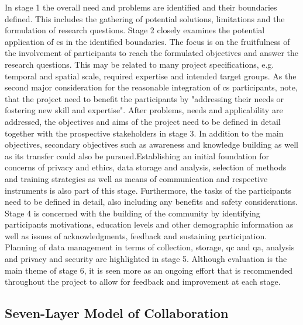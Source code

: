 In stage 1 the overall need and problems are identified and their boundaries defined. This includes the gathering of potential solutions, limitations and the formulation of research questions. Stage 2 closely examines the potential application of \acrshort{cs} in the identified boundaries. The focus is on the fruitfulness of the involvement of participants to reach the formulated objectives and answer the research questions. This may be related to many project specifications, e.g. temporal and spatial scale, required expertise and intended target groups. As the second major consideration for the reasonable integration of \acrshort{cs} participants, \autocite[2]{fraislCitizenScienceEnvironmental2022} note, that the project need to benefit the participants by "addressing their needs or fostering new skill and expertise". After problems, needs and applicability are addressed, the objectives and aims of the project need to be defined in detail together with the prospective stakeholders in stage 3. In addition to the main objectives, secondary objectives such as awareness and knowledge building as well as its transfer could also be pursued.Establishing an initial foundation for concerns of privacy and ethics, data storage and analysis, selection of methods and training strategies as well as means of communication and respective instruments is also part of this stage. Furthermore, the tasks of the participants need to be defined in detail, also including any benefits and safety considerations. Stage 4 is concerned with the building of the community by identifying participants motivations, education levels and other demographic information as well as issues of acknowledgments, feedback and sustaining participation. Planning of data management in terms of collection, storage, \acrfull{qc} and \acrfull{qa}, analysis and privacy and security are highlighted in stage 5. Although evaluation is the main theme of stage 6, it is seen more as an ongoing effort that is recommended throughout the project to allow for feedback and improvement at each stage.


\subsection{Seven-Layer Model of Collaboration}\label{subsec:slmc}

